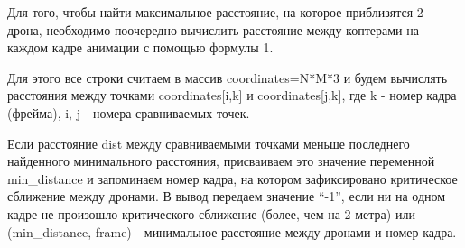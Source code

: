Для того, чтобы найти максимальное расстояние, на которое приблизятся 2 дрона, необходимо поочередно вычислить расстояние между коптерами на каждом кадре анимации с помощью формулы 1. 

Для этого все строки считаем в массив coordinates=N*M*3 и будем вычислять расстояния между точками  coordinates[i,k] и  coordinates[j,k], где k - номер кадра (фрейма), i, j - номера сравниваемых точек.

Если расстояние dist между сравниваемыми точками меньше последнего найденного минимального расстояния, присваиваем это значение переменной min\_distance и запоминаем номер кадра, на котором зафиксировано критическое сближение между дронами. 
В вывод передаем значение “-1”, если ни на одном кадре не произошло критического сближение (более, чем на 2 метра) или (min\_distance, frame) - минимальное расстояние между дронами и номер кадра.

